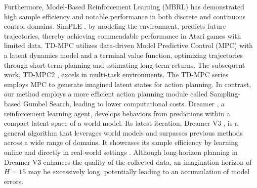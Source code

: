 Furthermore, Model-Based Reinforcement Learning (MBRL) has demonstrated high sample efficiency and notable performance in both discrete and continuous control domains.
SimPLE \citep{kaiser2019model}, by modeling the environment, predicts future trajectories, thereby achieving commendable performance in Atari games with limited data.
TD-MPC \citep{hansen2022temporal} utilizes data-driven Model Predictive Control (MPC) \citep{rubinstein1997optimization} with a latent dynamics model and a terminal value function, optimizing trajectories through short-term planning and estimating long-term returns. The subsequent work, TD-MPC2 \citep{Anonymous2023TDMPC2}, excels in multi-task environments. 
The TD-MPC series employs MPC to generate imagined latent states for action planning. In contrast, our method employs a more efficient action planning module called Sampling-based Gumbel Search, leading to lower computational costs.
Dreamer \citep{hafner2019dream}, a reinforcement learning agent, develops behaviors from predictions within a compact latent space of a world model. Its latest iteration, Dreamer V3 \citep{hafner2023mastering}, is a general algorithm that leverages world models and surpasses previous methods across a wide range of domains. It showcases its sample efficiency by learning online and directly in real-world settings \citep{daydreamer}. 
Although long-horizon planning in Dreamer V3 \citep{hafner2023mastering} enhances the quality of the collected data, an imagination horizon of $H=15$ may be excessively long, potentially leading to an accumulation of model errors.


